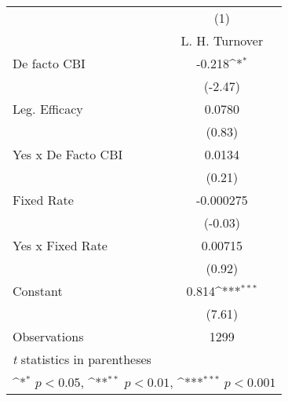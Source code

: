 \begin{table}[htbp]\centering
\def\sym#1{\ifmmode^{#1}\else\(^{#1}\)\fi}
\caption{\label{llpFEDF}}
\begin{tabular}{l*{1}{c}}
\toprule
                                        &\multicolumn{1}{c}{(1)}\\
                                        &\multicolumn{1}{c}{L. H. Turnover}\\
\midrule
De facto CBI                            &   -0.218\sym{*}  \\
                                        &  (-2.47)         \\
\addlinespace
Leg. Efficacy                           &   0.0780         \\
                                        &   (0.83)         \\
\addlinespace
Yes x De Facto CBI                      &   0.0134         \\
                                        &   (0.21)         \\
\addlinespace
Fixed Rate                              &-0.000275         \\
                                        &  (-0.03)         \\
\addlinespace
Yes x Fixed Rate                        &  0.00715         \\
                                        &   (0.92)         \\
\addlinespace
Constant                                &    0.814\sym{***}\\
                                        &   (7.61)         \\
\midrule
Observations                            &     1299         \\
\bottomrule
\multicolumn{2}{l}{\footnotesize \textit{t} statistics in parentheses}\\
\multicolumn{2}{l}{\footnotesize \sym{*} \(p<0.05\), \sym{**} \(p<0.01\), \sym{***} \(p<0.001\)}\\
\end{tabular}
\end{table}
